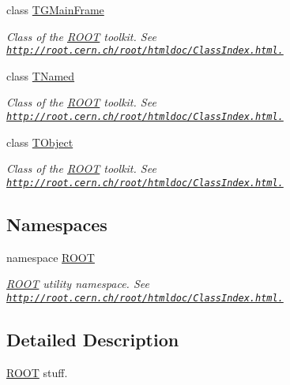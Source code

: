 \begin{DoxyCompactItemize}
class \hyperlink{class_t_g_main_frame}{TGMainFrame}
\begin{DoxyCompactList}\small\item\em Class of the \hyperlink{namespace_r_o_o_t}{ROOT} toolkit. See \href{http://root.cern.ch/root/htmldoc/ClassIndex.html.}{\tt http://root.cern.ch/root/htmldoc/ClassIndex.html.} \item\end{DoxyCompactList}\item 
class \hyperlink{class_t_named}{TNamed}
\begin{DoxyCompactList}\small\item\em Class of the \hyperlink{namespace_r_o_o_t}{ROOT} toolkit. See \href{http://root.cern.ch/root/htmldoc/ClassIndex.html.}{\tt http://root.cern.ch/root/htmldoc/ClassIndex.html.} \item\end{DoxyCompactList}\item 
class \hyperlink{class_t_object}{TObject}
\begin{DoxyCompactList}\small\item\em Class of the \hyperlink{namespace_r_o_o_t}{ROOT} toolkit. See \href{http://root.cern.ch/root/htmldoc/ClassIndex.html.}{\tt http://root.cern.ch/root/htmldoc/ClassIndex.html.} \item\end{DoxyCompactList}\end{DoxyCompactItemize}
\subsection*{Namespaces}
\begin{DoxyCompactItemize}
\item 
namespace \hyperlink{namespace_r_o_o_t}{ROOT}


\begin{DoxyCompactList}\small\item\em \hyperlink{namespace_r_o_o_t}{ROOT} utility namespace. See \href{http://root.cern.ch/root/htmldoc/ClassIndex.html.}{\tt http://root.cern.ch/root/htmldoc/ClassIndex.html.} \item\end{DoxyCompactList}\end{DoxyCompactItemize}


\subsection{Detailed Description}
\hyperlink{namespace_r_o_o_t}{ROOT} stuff. 